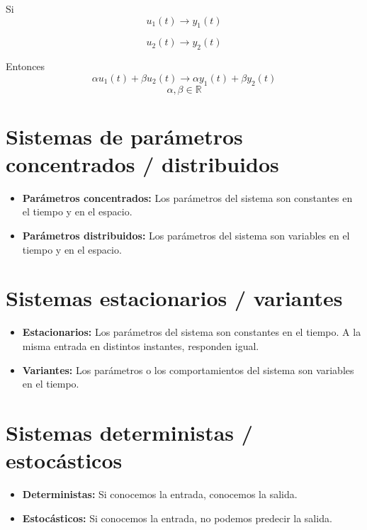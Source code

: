\documentclass[a4paper,12pt,numbers=noenddot]{scrreprt}
\begin{document}
    Si
    \begin{equation*}
        u_1(t) \rightarrow y_1(t)
    \end{equation*}

    \begin{equation*}
        u_2(t) \rightarrow y_2(t)
    \end{equation*}

    Entonces
    \begin{equation*}
        \alpha u_1(t) + \beta u_2(t) \rightarrow \alpha y_1(t) + \beta y_2(t)
    \end{equation*}
    \begin{equation*}
        \alpha, \beta \in \mathbb{R}
    \end{equation*}

    \section*{Sistemas de parámetros concentrados / distribuidos}
    \begin{itemize}
        \item \textbf{Parámetros concentrados:} Los parámetros del sistema son constantes
        en el tiempo y en el espacio.
        \item \textbf{Parámetros distribuidos:} Los parámetros del sistema son variables
        en el tiempo y en el espacio.
    \end{itemize}

    \section*{Sistemas estacionarios / variantes}
    \begin{itemize}
        \item \textbf{Estacionarios:} Los parámetros del sistema son constantes en el tiempo.
        A la misma entrada en distintos instantes, responden igual.
        \item \textbf{Variantes:} Los parámetros o los comportamientos del sistema 
        son variables en el tiempo.
    \end{itemize}

    \section*{Sistemas deterministas / estocásticos}
    \begin{itemize}
        \item \textbf{Deterministas:} Si conocemos la entrada, conocemos la salida.
        \item \textbf{Estocásticos:} Si conocemos la entrada, no podemos predecir la salida.
    \end{itemize}
\end{document}

